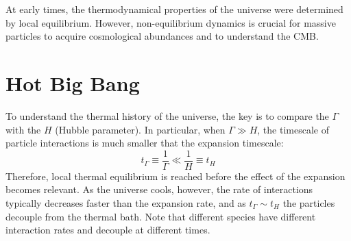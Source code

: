 
At early times, the thermodynamical properties of the universe were determined by local equilibrium. However, non-equilibrium dynamics is crucial for massive particles to acquire cosmological abundances and to understand the CMB.

\section{Hot Big Bang}
\label{sec:hot-big-bang}

To understand the thermal history of the universe, the key is to compare the  $ \Gamma $ with the  $ H $ (Hubble parameter). In particular, when $ \Gamma \gg H $, the timescale of particle interactions is much smaller that the expansion timescale:
\begin{equation}
  t_\Gamma \equiv \frac{1}{\Gamma} \ll \frac{1}{H} \equiv t_H
  \label{eq:thermal-eq-cond}
\end{equation}
Therefore, local thermal equilibrium is reached before the effect of the expansion becomes relevant. As the universe cools, however, the rate of interactions typically decreases faster than the expansion rate, and as $ t_\Gamma \sim t_H $ the particles decouple from the thermal bath. Note that different species have different interaction rates and decouple at different times.

